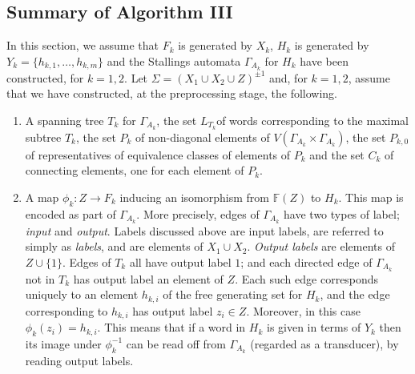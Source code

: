 \documentclass[a4paper,12pt]{article}
\newcommand{\G}{\Gamma }
\renewcommand{\S}{\Sigma }
\numberwithin{equation}{section}
\numberwithin{figure}{section}
\newcommand{\FF}{\ensuremath{\mathbb{F}}}
\newcommand{\maps}{\rightarrow}
\newcommand{\be}{\begin{enumerate}}
\newcommand{\ee}{\end{enumerate}}
\begin{document}
\subsection{Summary of Algorithm III}\label{sub:summaryIII}

In this section, we assume that 
$F_k$ is generated by $X_k$, $H_k$ is generated
by $Y_k=\{h_{k,1},\ldots, h_{k,m}\}$
and the Stallings automata $\G_{A_k}$ for $H_k$ have
been constructed, for $k=1,2$. Let  $\S=(X_1\cup X_2\cup Z)^{\pm 1}$ and, for $k=1,2$,
assume that we have constructed, at the preprocessing stage, the following.
\be
\item
A spanning tree  $T_k$ for $\G_{A_k}$,
 the set $L_{T_k}$of words corresponding to the  maximal subtree $T_k$,
the set $P_k$ of non-diagonal elements of
$V( \G_{A_k}\times \G_{A_k})$,
 the set $P_{k,0}$ of representatives  of equivalence classes of
elements of $P_k$ and the
set $C_k$ of connecting elements, one for each element of $P_k$.
\item A map $\phi_k:Z\maps F_k$  inducing an isomorphism from $\FF(Z)$ to
$H_k$. This map is encoded as part of $\G_{A_k}$. More precisely,
edges of $\G_{A_k}$ have two types of label; \emph{input} and \emph{output}.
Labels discussed above are input labels, are
referred to simply as \emph{labels}, and are elements of $X_1\cup X_2$.
\emph{Output labels} are elements of  $Z\cup \{1\}$.
 Edges of $T_k$  all have output label $1$; and each directed
edge of $\G_{A_k}$ not in $T_k$ has output
label an element of $Z$. Each such edge corresponds uniquely to
 an element $h_{k,i}$ of the free generating set for $H_k$, and the edge
corresponding to $h_{k,i}$ has
 output label  $z_i\in Z$. Moreover, in this case $\phi_k(z_i)=h_{k,i}$.
  This means that if a word in $H_k$ is given in terms of $Y_k$  then its
image under $\phi_k^{-1}$ can be read off from $\G_{A_k}$ (regarded as a
 transducer), by reading output labels.
\ee
\end{document}
